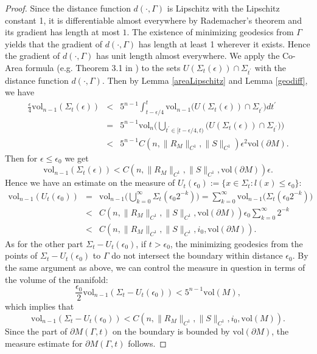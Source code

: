 \documentclass[11pt,letterpaper]{amsart}
\numberwithin{equation}{section}
\theoremstyle{definition}
\theoremstyle{plain}
\theoremstyle{definition}
\theoremstyle{plain}
\theoremstyle{definition}
\theoremstyle{plain}
\newcommand{\vol}{\textrm{vol}}
\begin{document}
\begin{proof}
Since the distance function $d(\cdot,\Gamma)$ is Lipschitz with the Lipschitz constant 1, it is differentiable almost everywhere by Rademacher's theorem and its gradient has length at most $1$. The existence of minimizing geodesics from $\Gamma$ yields that the gradient of $d(\cdot,\Gamma)$ has length at least 1 wherever it exists. 
Hence the gradient of $d(\cdot,\Gamma)$ has unit length almost everywhere. We apply the Co-Area formula (e.g. Theorem 3.1 in \cite{F}) to the sets $U(\Sigma_t(\epsilon))\cap \Sigma_{t^{\prime}}$ with the distance function $d(\cdot,\Gamma)$. Then by Lemma \ref{areaLipschitz} and Lemma \ref{geodiff}, we have
\begin{eqnarray*}
\frac{\epsilon}{4} \vol_{n-1}(\Sigma_t(\epsilon)) &<& 5^{n-1} \int_{t-\epsilon/4}^t \vol_{n-1}\big(U(\Sigma_t(\epsilon))\cap \Sigma_{t^{\prime}}\big) dt^{\prime} \\
&=& 5^{n-1} \vol_n \Big( \bigcup_{t^{\prime}\in [t-\epsilon/4,t)} \big(U(\Sigma_t(\epsilon))\cap \Sigma_{t^{\prime}}\big) \Big) \\
&<& 5^{n-1} C(n,\|R_M\|_{C^1},\|S\|_{C^1})\epsilon^2 \vol(\partial M).
\end{eqnarray*}
Then for $\epsilon\leqslant \epsilon_0$ we get
$$\vol_{n-1}(\Sigma_t(\epsilon))<C(n,\|R_M\|_{C^1},\|S\|_{C^1},\vol(\partial M))\epsilon.$$
Hence we have an estimate on the measure of $U_t(\epsilon_0):=\{x\in \Sigma_t: l(x)\leqslant \epsilon_0\}$:
\begin{eqnarray*}
\vol_{n-1}(U_t(\epsilon_0))&=&\vol_{n-1} \big(\bigcup_{k=0}^{\infty}\Sigma_t(\epsilon_0 2^{-k}) \big)=\sum_{k=0}^{\infty} \vol_{n-1} \big(\Sigma_t(\epsilon_0 2^{-k}) \big) \\
&<& C(n,\|R_M\|_{C^1},\|S\|_{C^1},\vol(\partial M))\epsilon_0\sum_{k=0}^{\infty}2^{-k} \\
&<& C(n,\|R_M\|_{C^1},\|S\|_{C^1},i_0,\vol(\partial M)).
\end{eqnarray*}
\indent As for the other part $\Sigma_t-U_t(\epsilon_0)$, if $t>\epsilon_0$, the minimizing geodesics from the points of $\Sigma_t-U_t(\epsilon_0)$ to $\Gamma$ do not intersect the boundary within distance $\epsilon_0$. By the same argument as above, we can control the measure in question in terms of the volume of the manifold:
$$ \frac{\epsilon_0}{2} \vol_{n-1}(\Sigma_t-U_t(\epsilon_0)) < 5^{n-1}\vol(M),$$
which implies that 
$$\vol_{n-1}(\Sigma_t-U_t(\epsilon_0)) < C(n,\|R_M\|_{C^1},\|S\|_{C^1},i_0,\vol(M)).$$ 
Since the part of $\partial M(\Gamma,t)$ on the boundary is bounded by $\vol(\partial M)$, the measure estimate for $\partial M(\Gamma,t)$ follows. 


\end{proof}
\end{document}
